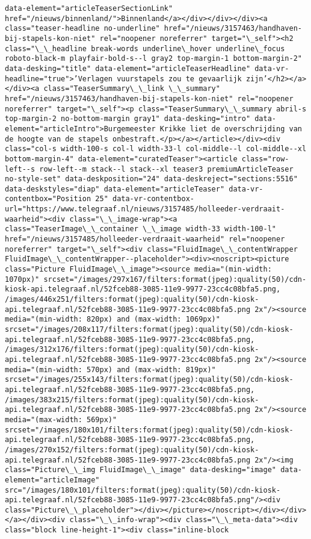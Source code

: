 \documentclass[11pt]{article}
\begin{document}
\begin{Verbatim}[commandchars=\\\{\}]
data-element="articleTeaserSectionLink" href="/nieuws/binnenland/">Binnenland</a></div></div></div><a class="teaser-headline no-underline" href="/nieuws/3157463/handhaven-bij-stapels-kon-niet" rel="noopener noreferrer" target="\_self"><h2 class="\_\_headline break-words underline\_hover underline\_focus roboto-black-m playfair-bold-s--l gray2 top-margin-1 bottom-margin-2" data-desking="title" data-element="articleTeaserHeadline" data-vr-headline="true">’Verlagen vuurstapels zou te gevaarlijk zijn’</h2></a></div><a class="TeaserSummary\_\_link \_\_summary" href="/nieuws/3157463/handhaven-bij-stapels-kon-niet" rel="noopener noreferrer" target="\_self"><p class="TeaserSummary\_\_summary abril-s top-margin-2 no-bottom-margin gray1" data-desking="intro" data-element="articleIntro">Burgemeester Krikke liet de overschrijding van de hoogte van de stapels onbestraft.</p></a></article></div><div class="col-s width-100-s col-l width-33-l col-middle--l col-middle--xl bottom-margin-4" data-element="curatedTeaser"><article class="row-left--s row-left--m stack--l stack--xl teaser3 premiumArticleTeaser no-style-set" data-deskposition="24" data-deskreject="sections:5516" data-deskstyles="diap" data-element="articleTeaser" data-vr-contentbox="Position 25" data-vr-contentbox-url="https://www.telegraaf.nl/nieuws/3157485/holleeder-verdraait-waarheid"><div class="\_\_image-wrap"><a class="TeaserImage\_\_container \_\_image width-33 width-100-l" href="/nieuws/3157485/holleeder-verdraait-waarheid" rel="noopener noreferrer" target="\_self"><div class="FluidImage\_\_contentWrapper FluidImage\_\_contentWrapper--placeholder"><div><noscript><picture class="Picture FluidImage\_\_image"><source media="(min-width: 1070px)" srcset="/images/297x167/filters:format(jpeg):quality(50)/cdn-kiosk-api.telegraaf.nl/52fceb88-3085-11e9-9977-23cc4c08bfa5.png, /images/446x251/filters:format(jpeg):quality(50)/cdn-kiosk-api.telegraaf.nl/52fceb88-3085-11e9-9977-23cc4c08bfa5.png 2x"/><source media="(min-width: 820px) and (max-width: 1069px)" srcset="/images/208x117/filters:format(jpeg):quality(50)/cdn-kiosk-api.telegraaf.nl/52fceb88-3085-11e9-9977-23cc4c08bfa5.png, /images/312x176/filters:format(jpeg):quality(50)/cdn-kiosk-api.telegraaf.nl/52fceb88-3085-11e9-9977-23cc4c08bfa5.png 2x"/><source media="(min-width: 570px) and (max-width: 819px)" srcset="/images/255x143/filters:format(jpeg):quality(50)/cdn-kiosk-api.telegraaf.nl/52fceb88-3085-11e9-9977-23cc4c08bfa5.png, /images/383x215/filters:format(jpeg):quality(50)/cdn-kiosk-api.telegraaf.nl/52fceb88-3085-11e9-9977-23cc4c08bfa5.png 2x"/><source media="(max-width: 569px)" srcset="/images/180x101/filters:format(jpeg):quality(50)/cdn-kiosk-api.telegraaf.nl/52fceb88-3085-11e9-9977-23cc4c08bfa5.png, /images/270x152/filters:format(jpeg):quality(50)/cdn-kiosk-api.telegraaf.nl/52fceb88-3085-11e9-9977-23cc4c08bfa5.png 2x"/><img class="Picture\_\_img FluidImage\_\_image" data-desking="image" data-element="articleImage" src="/images/180x101/filters:format(jpeg):quality(50)/cdn-kiosk-api.telegraaf.nl/52fceb88-3085-11e9-9977-23cc4c08bfa5.png"/><div class="Picture\_\_placeholder"></div></picture></noscript></div></div></a></div><div class="\_\_info-wrap"><div class="\_\_meta-data"><div class="block line-height-1"><div class="inline-block 
\end{Verbatim}
\end{document}
